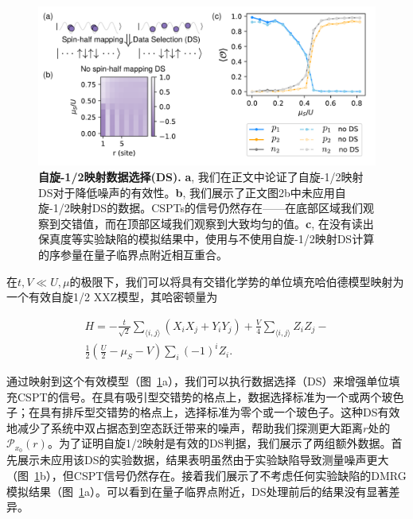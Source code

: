 \documentclass[preprint,superscriptaddress,floatfix, nofootinbib]{revtex4-2}
\begin{document}
\begin{CJK*}{UTF8}{gbsn}
\begin{figure}
    \centering
    \includegraphics[width=\textwidth]{figures/DS.pdf}
    \caption{\textbf{自旋-1/2映射数据选择(DS).} \textbf{a}, 我们在正文中论证了自旋-1/2映射DS对于降低噪声的有效性。\textbf{b}, 我们展示了正文图2b中未应用自旋-1/2映射DS的数据。CSPTs的信号仍然存在——在底部区域我们观察到交错值，而在顶部区域我们观察到大致均匀的值。\textbf{c}, 在没有读出保真度等实验缺陷的模拟结果中，使用与不使用自旋-1/2映射DS计算的序参量在量子临界点附近相互重合。
    }
    \label{fig: spin_half_DS_extended_data}
\end{figure}

在$t, V\ll U, \mu$的极限下，我们可以将具有交错化学势的单位填充哈伯德模型映射为一个有效自旋1/2 XXZ模型，其哈密顿量为

\begin{equation}
\label{eq: XXZ_Hamiltonian}
\begin{split}
H=-\frac{t}{\sqrt{2}}\sum_{\langle i,j \rangle}(X_iX_j+Y_iY_j)+\frac{V}{4}\sum_{\langle i,j \rangle}Z_iZ_j-\\\frac{1}{2}(\frac{U}{2}-\mu_S-V)\sum_i(-1)^iZ_i.
\end{split}
\end{equation}

通过映射到这个有效模型（图~\ref{fig: spin_half_DS_extended_data}a），我们可以执行数据选择（DS）来增强单位填充CSPT的信号。在具有吸引型交错势的格点上，数据选择标准为一个或两个玻色子；在具有排斥型交错势的格点上，选择标准为零个或一个玻色子。这种DS有效地减少了系统中双占据态到空态跃迁带来的噪声，帮助我们探测更大距离$r$处的$\mathcal{P}_{x_0}(r)$。为了证明自旋1/2映射是有效的DS判据，我们展示了两组额外数据。首先展示未应用该DS的实验数据，结果表明虽然由于实验缺陷导致测量噪声更大（图~\ref{fig: spin_half_DS_extended_data}b），但CSPT信号仍然存在。接着我们展示了不考虑任何实验缺陷的DMRG模拟结果（图~\ref{fig: spin_half_DS_extended_data}a）。可以看到在量子临界点附近，DS处理前后的结果没有显著差异。


\end{CJK*}
\end{document}
